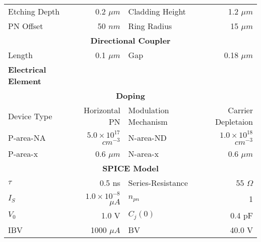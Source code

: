 \documentclass[\projectroot/template.tex]{subfiles}
\begin{document}
\begin{table}[!h]
\begin{tabular}{l @{\hskip-20pt}r @{\hskip10pt}l @{\hskip-30pt}r}
		Etching Depth                       & 0.2 $\mu m$                   & Cladding Height                     & 1.2 $\mu m$                   \\
		PN Offset                           & 50 $nm$                       & Ring Radius                         & 15 $\mu m$                    \\
		\multicolumn{4}{c}{\textbf{Directional Coupler}}                                              \\
		Length                              & 0.1 $\mu m$                   & Gap                                 & 0.18 $\mu m$                  \\ \toprule
		\textbf{Electrical Element}         &                               &                                     &                               \\ \toprule
		\multicolumn{4}{c}{\textbf{Doping}}                                                    \\
		Device Type                         & Horizontal PN                 & Modulation Mechanism                & Carrier Depletaion            \\
		P-area-NA                           & $5.0\times10^{17}$ $cm^{-3}$  & N-area-ND                           & $1.0\times 10^{18}$ $cm^{-3}$ \\
		P-area-x                            & 0.6 $\mu m$                   & N-area-x                            & 0.6 $\mu m$                   \\ %
		\multicolumn{4}{c}{\textbf{SPICE Model}}                                                  \\
		$\tau$                              & 0.5 ns                        & Series-Resistance                   & 55 $\Omega$                   \\
		$I_S$                               & $1.0\times 10^{-8}$ $\mu A$   & $n_{pn}$                            & 1                             \\
		$V_0$                               & 1.0 V                         & $C_j(0)$                            & 0.4 pF                        \\
		IBV                                 & 1000 $\mu A$                  & BV                                  & 40.0 V                        \\ \toprule

\end{tabular}
\end{table}
\end{document}
